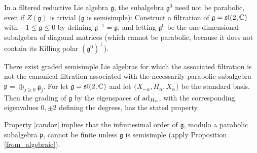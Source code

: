 \documentclass[leqno,12pt]{amsart} %
\begin{document}
\noindent%

In a filtered reductive Lie algebra $\mathfrak g$, the subalgebra ${\mathfrak g}^0$ need
not be parabolic, even if $Z({\mathfrak g})$ is trivial (${\mathfrak g} $ is semisimple):
Construct a filtration of ${\mathfrak g}=\mathfrak{sl}(2, {\mathbb C})$ with
$-1 \le {\mathfrak g} \le 0$ by defining ${\mathfrak g}^{-1}={\mathfrak g} $, and letting
${\mathfrak g}^0$ be the one-dimensional subalgebra of diagonal matrices (which cannot be
parabolic, because it does not contain its Killing polar $({\mathfrak g}^0)^\perp$).

There exist graded semisimple Lie algebras for which the associated filtration is not the
canonical filtration associated with the necessarily parabolic subalgebra
${\mathfrak p} = \oplus_{j\ge 0}{\mathfrak g}_j $. For let
${\mathfrak g} =\mathfrak{sl}(2, {\mathbb C})$ and let
$\{X_{-\alpha}, H_\alpha, X_\alpha\}$ be the standard basis. Then the grading of
${\mathfrak g} $ by the eigenspaces of $\operatorname{ad}_{H_\alpha}$, with the corresponding
eigenvalues $0, \pm 2$ defining the degrees, has the stated property.

Property \eqref{candoz} implies that the infinitesimal order of ${\mathfrak g}$, modulo a
parabolic subalgebra ${\mathfrak p}$, cannot be finite unless ${\mathfrak g} $ is
semisimple (apply Proposition \ref{from_algebraic}).
\end{document}
